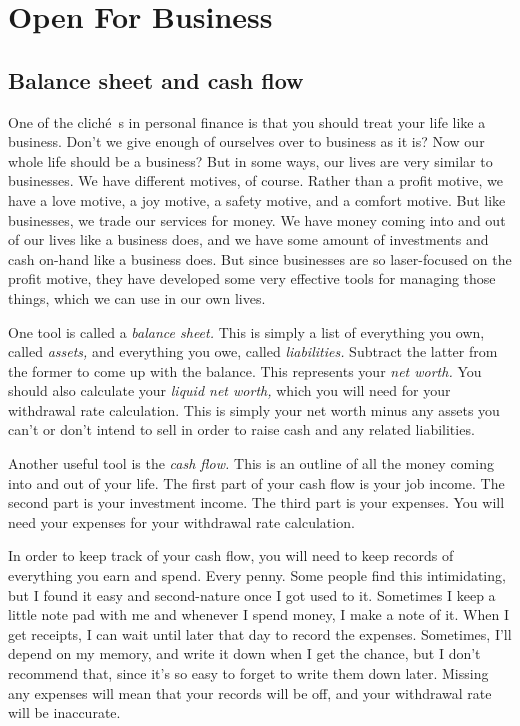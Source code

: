 \chapter{Open For Business}

\section{Balance sheet and cash flow}
One of the clich\'e~s in personal finance is that you should treat your life like a business. Don't we give enough of ourselves over to business as it is? Now our whole life should be a business? But in some ways, our lives are very similar to businesses. We have different motives, of course. Rather than a profit motive, we have a love motive, a joy motive, a safety motive, and a comfort motive. But like businesses, we trade our services for money. We have money coming into and out of our lives like a business does, and we have some amount of investments and cash on-hand like a business does. But since businesses are so laser-focused on the profit motive, they have developed some very effective tools for managing those things, which we can use in our own lives.

One tool is called a \emph{balance sheet.} This is simply a list of everything you own, called \emph{assets,} and everything you owe, called \emph{liabilities.} Subtract the latter from the former to come up with the balance. This represents your \emph{net worth.} You should also calculate your \emph{liquid net worth,} which you will need for your withdrawal rate calculation. This is simply your net worth minus any assets you can't or don't intend to sell in order to raise cash and any related liabilities.

Another useful tool is the \emph{cash flow.} This is an outline of all the money coming into and out of your life. The first part of your cash flow is your job income. The second part is your investment income. The third part is your expenses. You will need your expenses for your withdrawal rate calculation.

In order to keep track of your cash flow, you will need to keep records of everything you earn and spend. Every penny. Some people find this intimidating, but I found it easy and second-nature once I got used to it. Sometimes I keep a little note pad with me and whenever I spend money, I make a note of it. When I get receipts, I can wait until later that day to record the expenses. Sometimes, I'll depend on my memory, and write it down when I get the chance, but I don't recommend that, since it's so easy to forget to write them down later. Missing any expenses will mean that your records will be off, and your withdrawal rate will be inaccurate.


